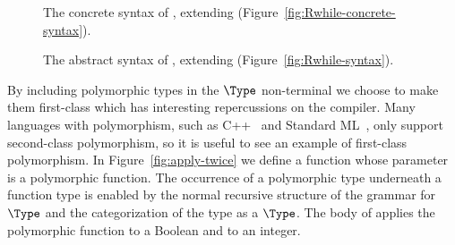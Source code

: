 \documentclass[11pt]{book}
\newcommand{\gray}[1]{{\color{gray} #1}}
\begin{document}
\begin{figure}[tp]
\centering
\fbox{
  \begin{minipage}{0.96\textwidth}
\small
\[
\begin{array}{lcl}
  \Type &::=& \ldots \mid \LP\key{All}~\LP\Var\ldots\RP~ \Type\RP \mid \Var \\
  \Def &::=& \gray{ \CDEF{\Var}{\LS\Var \key{:} \Type\RS \ldots}{\Type}{\Exp} } \\
   &\mid& \LP\key{:}~\Var~\Type\RP \\
   &&       \LP\key{define}~ \LP\Var ~ \Var\ldots\RP ~ \Exp\RP  \\
  \LangPoly{} &::=& \gray{ \Def \ldots ~ \Exp }
\end{array}
\]
\end{minipage}
}
\caption{The concrete syntax of \LangPoly{}, extending \LangLoop{}
    (Figure~\ref{fig:Rwhile-concrete-syntax}).}
\label{fig:Rpoly-concrete-syntax}
\end{figure}

\begin{figure}[tp]
\centering
\fbox{
  \begin{minipage}{0.96\textwidth}
\small
\[
\begin{array}{lcl}
  \Type &::=& \ldots \mid \LP\key{All}~\LP\Var\ldots\RP~ \Type\RP \mid \Var \\
  \Def &::=& \gray{ \DEF{\Var}{\LP\LS\Var \key{:} \Type\RS \ldots\RP}{\Type}{\code{'()}}{\Exp} } \\
   &\mid& \DECL{\Var}{\Type} \\
   &&  \DEF{\Var}{\LP\Var \ldots\RP}{\key{'Any}}{\code{'()}}{\Exp}  \\
  \LangPoly{} &::=& \gray{ \PROGRAMDEFSEXP{\code{'()}}{\LP\Def\ldots\RP}{\Exp} }
\end{array}
\]
\end{minipage}
}
\caption{The abstract syntax of \LangPoly{}, extending \LangLoop{}
    (Figure~\ref{fig:Rwhile-syntax}).}
\label{fig:Rpoly-syntax}
\end{figure}

By including polymorphic types in the $\Type$ non-terminal we choose
to make them first-class which has interesting repercussions on the
compiler. Many languages with polymorphism, such as
C++~\citep{stroustrup88:_param_types} and Standard
ML~\citep{Milner:1990fk}, only support second-class polymorphism, so
it is useful to see an example of first-class polymorphism. In
Figure~\ref{fig:apply-twice} we define a function 
whose parameter is a polymorphic function. The occurrence of a
polymorphic type underneath a function type is enabled by the normal
recursive structure of the grammar for $\Type$ and the categorization
of the  type as a $\Type$.  The body of 
applies the polymorphic function to a Boolean and to an integer.
\end{document}
